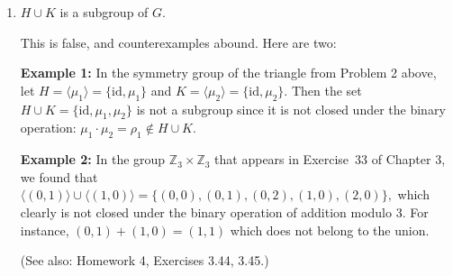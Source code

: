 \documentclass[12pt]{article}
\newcommand{\<}{\ensuremath{\langle}}
\renewcommand{\>}{\ensuremath{\rangle}}
\newcommand{\Z}{\ensuremath{\mathbb{Z}}}
\begin{document}
\begin{enumerate}[{\bf 1.}]
\begin{enumerate}
    {\bf Proof:}
    Let $I = H\cap K$. We check that $I$ is a subgroup of $G$.
    Proposition 3.9 states that this is equivalent to showing that $I$ is closed
    under the three operations (nullary, unary, binary) of $G$.  In other words,
    we must show that $I$ contains the identity (the nullary op), 
    $I$ is closed under inverse (the unary op), and
    $I$ is closed under multiplication (the binary op). 
    \begin{itemize}
    \item  (nullary closure) Clearly $e\in I$ since both $H$ and $K$, being themselves
      subgroups, contain $e$.
    \item (unary closure) If $x\in I= H\cap K$, then
      $x \in H$ and $H$ is a subgroup, so $x^{-1}\in H$.
      Similarly, $x \in K$ and $K$ a subgroup implies $x^{-1}\in K$.
      Therefore, $x^{-1} \in H \cap K$.
    \item (binary closure) Suppose $x$ and $y$ belong to $H\cap K$.
      Then, since $x, y \in H$ and $H$ is a subgroup, we have $xy \in H$.
      Similarly, $x, y \in K$ and $K$ a subgroup implies $xy \in K$.  Therefore, 
      $xy \in H\cap K$.
    \end{itemize}

    \bigskip

  \item $H\cup K$ is a subgroup of $G$.

    \medskip
    This is false, and counterexamples abound.
    Here are two:

\medskip

    {\bf Example 1:}
    In the symmetry group of the triangle from Problem 2 above, let 
    $H = \<\mu_1\> = \{\mathrm{id}, \mu_1\}$ and 
    $K = \<\mu_2\> = \{\mathrm{id}, \mu_2\}$.  
    Then the set $H\cup K = \{\mathrm{id}, \mu_1, \mu_2\}$ is not a subgroup
    since it is not closed under the binary operation: 
    $\mu_1 \cdot \mu_2 = \rho_1\notin H\cup K$. 

\medskip

    {\bf Example 2:}
    In the group $\Z_3 \times \Z_3$ that appears in Exercise~33 of Chapter 3, we
    found that $\<(0,1)\> \cup \<(1,0)\> = \{(0,0), (0,1), (0,2), (1,0), (2,0)\},$
    which clearly is not closed under the binary operation of 
    addition modulo 3.  For instance, $(0,1) + (1,0) = (1,1)$ which does not belong
    to the union.
 
\vskip1cm

(See also: Homework 4, Exercises 3.44, 3.45.)
  \end{enumerate}
  \newpage


\end{enumerate}
\end{document}
